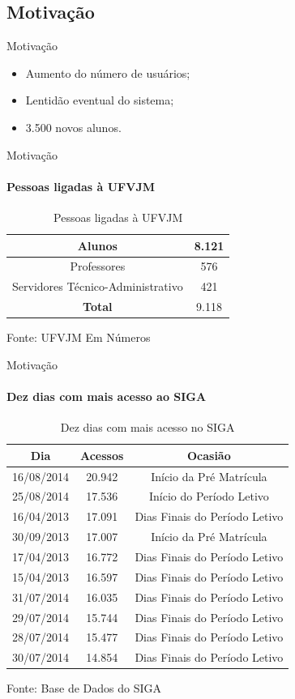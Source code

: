 \documentclass[aspectratio=43]{beamer}
\begin{document}
\subsection{Motivação}

\begin{frame}{Motivação}
	\begin{itemize}
		\item Aumento do número de usuários; \pause
		\item Lentidão eventual do sistema; \pause
		\item 3.500 novos alunos.
	\end{itemize}
\end{frame}
\begin{frame}{Motivação}
	\framesubtitle{Pessoas ligadas à UFVJM}
	\centering
	\begin{table}
		\caption{Pessoas ligadas à UFVJM}
		\begin{tabular}{|c|c|}
			\hline
			Alunos & 8.121 \\ \hline
			Professores & 576 \\ \hline
			Servidores Técnico-Administrativo & 421 \\ \hline
			\textbf{Total} & 9.118 \\ \hline
		\end{tabular}
	\end{table}
		Fonte: UFVJM Em Números
\end{frame}
\begin{frame}{Motivação}
\framesubtitle{Dez dias com mais acesso ao SIGA}
	\centering
	\begin{table}
		\caption{Dez dias com mais acesso no SIGA}
		\begin{tabular}{|c|c|c|}
			\hline
			\textbf{Dia} & \textbf{Acessos}  & \textbf{Ocasião} \\ \hline
			16/08/2014 & 20.942 & Início da Pré Matrícula \\ \hline
			25/08/2014 & 17.536 & Início do Período Letivo \\ \hline
			16/04/2013 & 17.091 & Dias Finais do Período Letivo \\ \hline
			30/09/2013 & 17.007 & Início da Pré Matrícula \\ \hline
			17/04/2013 & 16.772 & Dias Finais do Período Letivo \\ \hline
			15/04/2013 & 16.597 & Dias Finais do Período Letivo \\ \hline
			31/07/2014 & 16.035 & Dias Finais do Período Letivo \\ \hline
			29/07/2014 & 15.744 & Dias Finais do Período Letivo \\ \hline
			28/07/2014 & 15.477 & Dias Finais do Período Letivo \\ \hline
			30/07/2014 & 14.854 & Dias Finais do Período Letivo \\ \hline
		\end{tabular}
	\end{table}
	Fonte: Base de Dados do SIGA
\end{frame}
\end{document}
